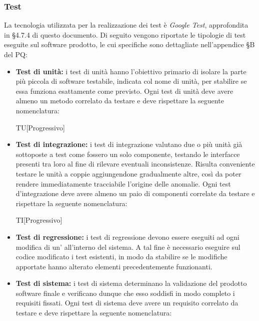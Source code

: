 \documentclass[../NormediProgetto.tex]{subfiles}
\begin{document}
\subsubsection{Test}

La tecnologia utilizzata per la realizzazione dei test è \textit{Google Test}, approfondita in §4.7.4 di questo documento. 
Di seguito vengono riportate le tipologie di test eseguite sul software prodotto, le cui specifiche sono dettagliate nell'appendice §B del PQ:

\begin{itemize}
    \item \textbf{Test di unità:} i test di unità hanno l'obiettivo primario di isolare la parte più piccola di software testabile, indicata col nome di unità, per stabilire se essa funziona esattamente come previsto. Ogni test di unità deve avere almeno un metodo correlato da testare e deve rispettare la seguente nomenclatura:
    
    \begin{center}
        TU[Progressivo]
    \end{center}

    \item \textbf{Test di integrazione:} i test di integrazione valutano due o più unità già sottoposte a test come fossero un solo componente, testando le interfacce presenti tra loro al fine di rilevare eventuali inconsistenze. Risulta conveniente testare le unità a coppie aggiungendone gradualmente altre, così da poter rendere immediatamente tracciabile l'origine delle anomalie. Ogni test d'integrazione deve avere almeno un paio di componenti correlate da testare e rispettare la seguente nomenclatura:
    
    \begin{center}
        TI[Progressivo]
    \end{center}
    
    \item \textbf{Test di regressione:} i test di regressione devono essere eseguiti ad ogni modifica di un’ all'interno del sistema. A tal fine è necessario eseguire sul codice modificato i test esistenti, in modo da stabilire se le modifiche apportate hanno alterato elementi precedentemente funzionanti.
    
    \item \textbf{Test di sistema:} i test di sistema determinano la validazione del prodotto software finale e verificano dunque che esso soddisfi in modo completo i requisiti fissati. Ogni test di sistema deve avere un requisito correlato da testare e deve rispettare la seguente nomenclatura:
    

\end{itemize}
\end{document}
